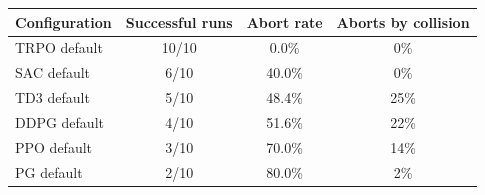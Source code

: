 \begin{tabular}{lccc}
\toprule
Configuration & Successful runs & Abort rate & Aborts by collision \\
\midrule
TRPO default & 10/10 & 0.0\% & 0\% \\
SAC default & 6/10 & 40.0\% & 0\% \\
TD3 default & 5/10 & 48.4\% & 25\% \\
DDPG default & 4/10 & 51.6\% & 22\% \\
PPO default & 3/10 & 70.0\% & 14\% \\
PG default & 2/10 & 80.0\% & 2\% \\
\bottomrule
\end{tabular}
